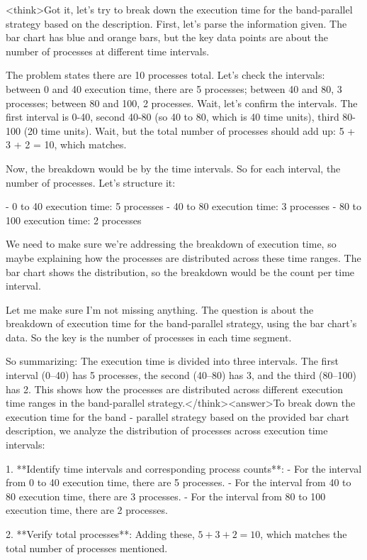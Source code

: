<think>Got it, let's try to break down the execution time for the band-parallel strategy based on the description. First, let's parse the information given. The bar chart has blue and orange bars, but the key data points are about the number of processes at different time intervals. 

The problem states there are 10 processes total. Let's check the intervals: between 0 and 40 execution time, there are 5 processes; between 40 and 80, 3 processes; between 80 and 100, 2 processes. Wait, let's confirm the intervals. The first interval is 0-40, second 40-80 (so 40 to 80, which is 40 time units), third 80-100 (20 time units). Wait, but the total number of processes should add up: 5 + 3 + 2 = 10, which matches. 

Now, the breakdown would be by the time intervals. So for each interval, the number of processes. Let's structure it:

- 0 to 40 execution time: 5 processes
- 40 to 80 execution time: 3 processes
- 80 to 100 execution time: 2 processes

We need to make sure we're addressing the breakdown of execution time, so maybe explaining how the processes are distributed across these time ranges. The bar chart shows the distribution, so the breakdown would be the count per time interval. 

Let me make sure I'm not missing anything. The question is about the breakdown of execution time for the band-parallel strategy, using the bar chart's data. So the key is the number of processes in each time segment. 

So summarizing: The execution time is divided into three intervals. The first interval (0–40) has 5 processes, the second (40–80) has 3, and the third (80–100) has 2. This shows how the processes are distributed across different execution time ranges in the band-parallel strategy.</think><answer>To break down the execution time for the band - parallel strategy based on the provided bar chart description, we analyze the distribution of processes across execution time intervals:  

1. **Identify time intervals and corresponding process counts**:  
   - For the interval from 0 to 40 execution time, there are 5 processes.  
   - For the interval from 40 to 80 execution time, there are 3 processes.  
   - For the interval from 80 to 100 execution time, there are 2 processes.  

2. **Verify total processes**:  
   Adding these, \( 5 + 3 + 2 = 10 \), which matches the total number of processes mentioned.    

